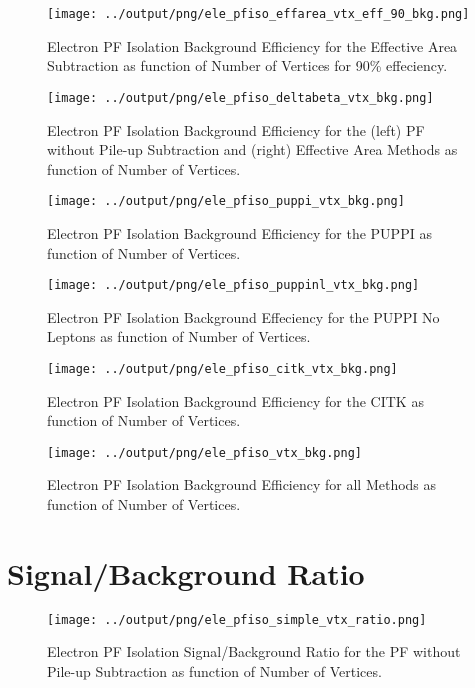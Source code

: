 \documentclass[11pt]{book}
\begin{document}
\begin{figure}[htb]
\centering
\texttt{[image: ../output/png/ele\_pfiso\_effarea\_vtx\_eff\_90\_bkg.png]}
\caption{Electron PF Isolation Background Efficiency for the Effective Area Subtraction as function of Number of Vertices for 90\% effeciency.}
\label{fig:ele_pfiso_vtx_eff_effarea_eff_90_bkg}
\end{figure}

\clearpage

\begin{figure}[htb]
\centering
\texttt{[image: ../output/png/ele\_pfiso\_deltabeta\_vtx\_bkg.png]}
\caption{Electron PF Isolation Background Efficiency for the (left) PF without Pile-up Subtraction and (right) Effective Area Methods as function of Number of Vertices.}
\label{fig:ele_pfiso_vtx_bkg_deltabeta}
\end{figure}

\begin{figure}[htb]
\centering
\texttt{[image: ../output/png/ele\_pfiso\_puppi\_vtx\_bkg.png]}
\caption{Electron PF Isolation Background Efficiency for the PUPPI as function of Number of Vertices.}
\label{fig:ele_pfiso_vtx_bgk_puppi}
\end{figure}

\begin{figure}[htb]
\centering
\texttt{[image: ../output/png/ele\_pfiso\_puppinl\_vtx\_bkg.png]}
\caption{Electron PF Isolation Background Effeciency for the PUPPI No Leptons as function of Number of Vertices.}
\label{fig:ele_pfiso_vtx_bkg_puppinl}
\end{figure}

\begin{figure}[htb]
\centering
\texttt{[image: ../output/png/ele\_pfiso\_citk\_vtx\_bkg.png]}
\caption{Electron PF Isolation Background Efficiency for the CITK as function of Number of Vertices.}
\label{fig:ele_pfiso_vtx_bkg_citk}
\end{figure}

\begin{figure}[htb]
\centering
\texttt{[image: ../output/png/ele\_pfiso\_vtx\_bkg.png]}
\caption{Electron PF Isolation Background Efficiency for all Methods as function of Number of Vertices.}
\label{fig:ele_pfiso_vtx_bkg}
\end{figure}
\clearpage

\section{Signal/Background Ratio}
\begin{figure}[htb]
\centering
\texttt{[image: ../output/png/ele\_pfiso\_simple\_vtx\_ratio.png]}
\caption{Electron PF Isolation Signal/Background Ratio for the PF without Pile-up Subtraction as function of Number of Vertices.}
\label{fig:ele_pfiso_vtx_ratio_simple}
\end{figure}
\end{document}
